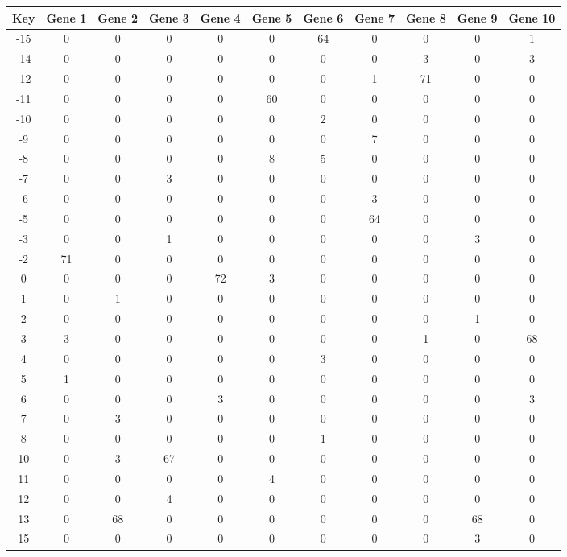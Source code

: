 \begin{tabular}{|c|c|c|c|c|c|c|c|c|c|c|}
\hline
Key & Gene 1 & Gene 2 & Gene 3 & Gene 4 & Gene 5 & Gene 6 & Gene 7 & Gene 8 & Gene 9 & Gene 10 \\
\hline
-15 & 0 & 0 & 0 & 0 & 0 & 64 & 0 & 0 & 0 & 1 \\
-14 & 0 & 0 & 0 & 0 & 0 & 0 & 0 & 3 & 0 & 3 \\
-12 & 0 & 0 & 0 & 0 & 0 & 0 & 1 & 71 & 0 & 0 \\
-11 & 0 & 0 & 0 & 0 & 60 & 0 & 0 & 0 & 0 & 0 \\
-10 & 0 & 0 & 0 & 0 & 0 & 2 & 0 & 0 & 0 & 0 \\
-9 & 0 & 0 & 0 & 0 & 0 & 0 & 7 & 0 & 0 & 0 \\
-8 & 0 & 0 & 0 & 0 & 8 & 5 & 0 & 0 & 0 & 0 \\
-7 & 0 & 0 & 3 & 0 & 0 & 0 & 0 & 0 & 0 & 0 \\
-6 & 0 & 0 & 0 & 0 & 0 & 0 & 3 & 0 & 0 & 0 \\
-5 & 0 & 0 & 0 & 0 & 0 & 0 & 64 & 0 & 0 & 0 \\
-3 & 0 & 0 & 1 & 0 & 0 & 0 & 0 & 0 & 3 & 0 \\
-2 & 71 & 0 & 0 & 0 & 0 & 0 & 0 & 0 & 0 & 0 \\
0 & 0 & 0 & 0 & 72 & 3 & 0 & 0 & 0 & 0 & 0 \\
1 & 0 & 1 & 0 & 0 & 0 & 0 & 0 & 0 & 0 & 0 \\
2 & 0 & 0 & 0 & 0 & 0 & 0 & 0 & 0 & 1 & 0 \\
3 & 3 & 0 & 0 & 0 & 0 & 0 & 0 & 1 & 0 & 68 \\
4 & 0 & 0 & 0 & 0 & 0 & 3 & 0 & 0 & 0 & 0 \\
5 & 1 & 0 & 0 & 0 & 0 & 0 & 0 & 0 & 0 & 0 \\
6 & 0 & 0 & 0 & 3 & 0 & 0 & 0 & 0 & 0 & 3 \\
7 & 0 & 3 & 0 & 0 & 0 & 0 & 0 & 0 & 0 & 0 \\
8 & 0 & 0 & 0 & 0 & 0 & 1 & 0 & 0 & 0 & 0 \\
10 & 0 & 3 & 67 & 0 & 0 & 0 & 0 & 0 & 0 & 0 \\
11 & 0 & 0 & 0 & 0 & 4 & 0 & 0 & 0 & 0 & 0 \\
12 & 0 & 0 & 4 & 0 & 0 & 0 & 0 & 0 & 0 & 0 \\
13 & 0 & 68 & 0 & 0 & 0 & 0 & 0 & 0 & 68 & 0 \\
15 & 0 & 0 & 0 & 0 & 0 & 0 & 0 & 0 & 3 & 0 \\
\hline
\end{tabular}